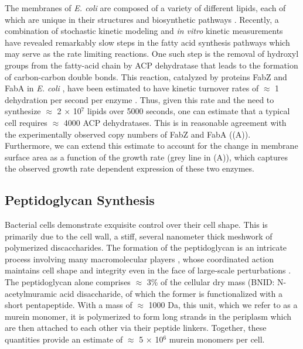 The membranes of \textit{E. coli} are composed of a variety of different lipids,
each of which are unique in their structures and biosynthetic pathways
\citep{sohlenkamp2016}. Recently, a combination of stochastic kinetic modeling
\citep{ruppe2018} and \textit{in vitro} kinetic measurements
\citep{ranganathan2012, yu2011} have revealed remarkably slow steps in the fatty
acid synthesis pathways which may serve as the rate limiting reactions. One such
step is the removal of hydroxyl groups from the fatty-acid chain by ACP
dehydratase that leads to the formation of carbon-carbon double bonds. This
reaction, catalyzed by proteins FabZ and FabA in \textit{E. coli}
\citep{yu2011}, have been estimated to have kinetic turnover rates of $\approx$
1 dehydration per second per enzyme \citep{ruppe2018}. Thus, given this rate and
the need to synthesize $\approx$ 2 $\times$ 10$^7$ lipids over 5000 seconds, one
can estimate that a typical cell requires $\approx$ 4000 ACP dehydratases. This
is in reasonable agreement with the experimentally observed copy numbers of FabZ
and FabA ((A)). Furthermore, we can extend this estimate to
account for the change in membrane surface area as a function of the growth rate
(grey line in (A)), which captures the observed growth rate
dependent expression of these two enzymes.


\subsection{Peptidoglycan Synthesis}
Bacterial cells demonstrate exquisite control over their cell shape. This is
primarily due to the cell wall, a stiff, several nanometer thick meshwork of
polymerized discaccharides. The formation of the peptidoglycan is an intricate
process involving many macromolecular players \citep{shi2018, morgenstein2015},
whose coordinated action maintains cell shape and integrity even in the face of
large-scale perturbations \citep{harris2018,shi2018}.
The peptidoglycan alone comprises $\approx$ 3\% of the cellular dry mass (BNID:
N-acetylmuramic acid disaccharide, of which the former is functionalized with a
short pentapeptide. With a mass of $\approx$ 1000 Da, this unit, which we refer
to as a murein monomer, it is polymerized to form long strands in the periplasm
which are then attached to each other via their peptide linkers. Together, these
quantities provide an estimate of $\approx$ 5 $\times$ 10$^6$ murein monomers
per cell.

